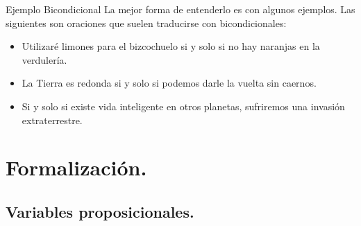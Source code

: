 

\begin{frame}{Ejemplo Bicondicional}
  La mejor forma de entenderlo es con algunos ejemplos. Las siguientes son
  oraciones que suelen traducirse con bicondicionales:
  \begin{itemize}
    \item Utilizaré limones para el bizcochuelo si y solo si no hay naranjas en la verdulería.
    \item La Tierra es redonda si y solo si podemos darle la vuelta sin caernos.
    \item Si y solo si existe vida inteligente en otros planetas, sufriremos una
    invasión extraterrestre.
  \end{itemize}
\end{frame}


\section{Formalización.}
\subsection{Variables proposicionales.}


